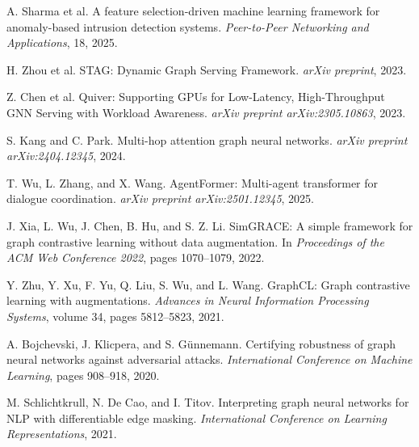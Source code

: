 \documentclass{article}
\begin{document}
\begin{thebibliography}{99}
A. Sharma et al.
\newblock A feature selection-driven machine learning framework for anomaly-based intrusion detection systems.
\newblock \emph{Peer-to-Peer Networking and Applications}, 18, 2025.

H. Zhou et al.
\newblock STAG: Dynamic Graph Serving Framework.
\newblock \emph{arXiv preprint}, 2023.

Z. Chen et al.
\newblock Quiver: Supporting GPUs for Low-Latency, High-Throughput GNN Serving with Workload Awareness.
\newblock \emph{arXiv preprint arXiv:2305.10863}, 2023.

S. Kang and C. Park.
\newblock Multi-hop attention graph neural networks.
\newblock \emph{arXiv preprint arXiv:2404.12345}, 2024.

T. Wu, L. Zhang, and X. Wang.
\newblock AgentFormer: Multi-agent transformer for dialogue coordination.
\newblock \emph{arXiv preprint arXiv:2501.12345}, 2025.

J. Xia, L. Wu, J. Chen, B. Hu, and S. Z. Li.
\newblock SimGRACE: A simple framework for graph contrastive learning without data augmentation.
\newblock In \emph{Proceedings of the ACM Web Conference 2022}, pages 1070--1079, 2022.

Y. Zhu, Y. Xu, F. Yu, Q. Liu, S. Wu, and L. Wang.
\newblock GraphCL: Graph contrastive learning with augmentations.
\newblock \emph{Advances in Neural Information Processing Systems}, volume 34, pages 5812--5823, 2021.

A. Bojchevski, J. Klicpera, and S. G\"{u}nnemann.
\newblock Certifying robustness of graph neural networks against adversarial attacks.
\newblock \emph{International Conference on Machine Learning}, pages 908--918, 2020.


M. Schlichtkrull, N. De Cao, and I. Titov.
\newblock Interpreting graph neural networks for NLP with differentiable edge masking.
\newblock \emph{International Conference on Learning Representations}, 2021.

\end{thebibliography}

\newpage

\end{document}

